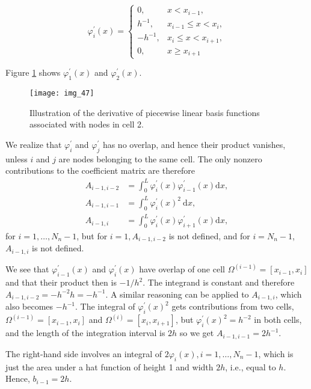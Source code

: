 \documentclass[../main.tex]{subfiles}
\begin{document}
		\begin{equation}
		\label{eqa171}
			\varphi_{i}^{\prime}(x)= \begin{cases}0, & x<x_{i-1}, \\ h^{-1}, & x_{i-1} \leq x<x_{i}, \\ -h^{-1}, & x_{i} \leq x<x_{i+1}, \\ 0, & x \geq x_{i+1}\end{cases}
		\end{equation}
	
		Figure \ref{fig:img_47} shows $\varphi_{1}^{\prime}(x)$ and $\varphi_{2}^{\prime}(x)$.
		\begin{figure}[H]
			\centering
			\texttt{[image: img\_47]}
			\caption{Illustration of the derivative of piecewise linear basis functions associated with nodes in cell 2.}
			\label{fig:img_47}
		\end{figure}
		We realize that $\varphi_{i}^{\prime}$ and $\varphi_{j}^{\prime}$ has no overlap, and hence their product vanishes, unless $i$ and $j$ are nodes belonging to the same cell. The only nonzero contributions to the coefficient matrix are therefore
		$$
		\begin{aligned}
			A_{i-1, i-2} &=\int_{0}^{L} \varphi_{i}^{\prime}(x) \varphi_{i-1}^{\prime}(x) \mathrm{d} x, \\
			A_{i-1, i-1} &=\int_{0}^{L} \varphi_{i}^{\prime}(x)^{2} \mathrm{~d} x, \\
			A_{i-1, i} &=\int_{0}^{L} \varphi_{i}^{\prime}(x) \varphi_{i+1}^{\prime}(x) \mathrm{d} x,
		\end{aligned}
		$$
		for $i=1, \ldots, N_{n}-1$, but for $i=1, A_{i-1, i-2}$ is not defined, and for $i=N_{n}-1$, $A_{i-1, i}$ is not defined.
		
		We see that $\varphi_{i-1}^{\prime}(x)$ and $\varphi_{i}^{\prime}(x)$ have overlap of one cell $\Omega^{(i-1)}=\left[x_{i-1}, x_{i}\right]$ and that their product then is $-1 / h^{2}$. The integrand is constant and therefore $A_{i-1, i-2}=-h^{-2} h=-h^{-1}$. A similar reasoning can be applied to $A_{i-1, i}$, which also becomes $-h^{-1}$. The integral of $\varphi_{i}^{\prime}(x)^{2}$ gets contributions from two cells, $\Omega^{(i-1)}=\left[x_{i-1}, x_{i}\right]$ and $\Omega^{(i)}=\left[x_{i}, x_{i+1}\right]$, but $\varphi_{i}^{\prime}(x)^{2}=h^{-2}$ in both cells, and the length of the integration interval is $2 h$ so we get $A_{i-1, i-1}=2 h^{-1}$.
		
		The right-hand side involves an integral of $2 \varphi_{i}(x), i=1, \ldots, N_{n}-1$, which is just the area under a hat function of height 1 and width $2 h$, i.e., equal to $h$. Hence, $b_{i-1}=2 h$.
		
\end{document}

